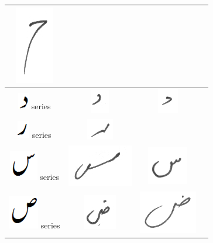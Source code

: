 \begin{table}[h]
\begin{tabular}{@{}cccc@{}}
\includegraphics[scale=0.15]{157}  \\
\hline
\includegraphics[scale=0.25]{daal_orig} series & \includegraphics[scale=0.15]{158} & \includegraphics[scale=0.15]{159}  &  \\
\hline
\includegraphics[scale=0.25]{re_orig} series & \includegraphics[scale=0.15]{160} &  &  \\
\hline
\includegraphics[scale=0.25]{seen_orig} series & \includegraphics[scale=0.15]{161} & 
\includegraphics[scale=0.20]{162} &  \\
\hline
\includegraphics[scale=0.20]{suad_orig} series & \includegraphics[scale=0.15]{163} & \includegraphics[scale=0.15]{164} &  \\

\end{tabular}
\end{table}
